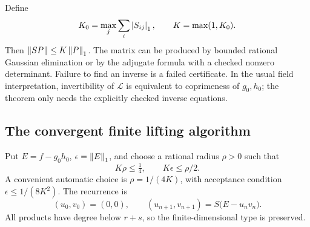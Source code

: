 Define
\[
 K_0=\max_j\sum_i\left|S_{ij}\right|_1,\qquad K=\max(1,K_0).
\]
Then \(\left\lVert SP\right\rVert\le K\left\lVert P\right\rVert_1\). The matrix can be produced by bounded rational Gaussian elimination or by the adjugate formula with a checked nonzero determinant. Failure to find an inverse is a failed certificate. In the usual field interpretation, invertibility of \(\mathcal L\) is equivalent to coprimeness of \(g_0,h_0\); the theorem only needs the explicitly checked inverse equations.

\subsection{The convergent finite lifting algorithm}

Put \(E=f-g_0h_0\), \(\epsilon=\left\lVert E\right\rVert_1\), and choose a rational radius \(\rho>0\) such that
\begin{equation}\label{eq:factorcertificate}
 K\rho\le\tfrac14,\qquad K\epsilon\le\rho/2.
\end{equation}
A convenient automatic choice is
\(\rho=1/(4K)\), with acceptance condition
\(\epsilon\le1/(8K^2)\).
The recurrence is
\begin{equation}\label{eq:factoriteration}
 (u_0,v_0)=(0,0),\qquad
 (u_{n+1},v_{n+1})=S\bigl(E-u_nv_n\bigr).
\end{equation}
All products have degree below \(r+s\), so the finite-dimensional type is preserved.

